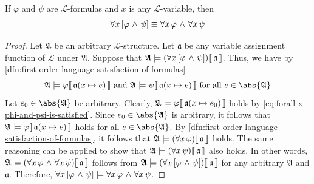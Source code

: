 \begin{thm}
     \label{logical-equivalence:universal-quantifiers-distributes-over-conjunction}
    If \( \varphi \) and \( \psi \) are \( \mathcal{L} \)-formulas and \( x \) is any \( \mathcal{L} \)-variable,
    then
    \begin{equation*}
        \forall x \, \mleft[ \varphi \,\,{\land}\,\, \psi \mright] \equiv \forall x \, \varphi \,\,{\land}\,\, \forall x \, \psi
    \end{equation*}
\end{thm}

\begin{proof}
    Let \( \mathfrak{A} \) be an arbitrary \( \mathcal{L} \)-structure. Let \( \mathfrak{a} \) be any variable assignment function of \( \mathcal{L} \) under \( \mathfrak{A} \).
    Suppose that \( \folwffsatisfaction{\mathfrak{A}}{\mleft( \forall x \, \mleft[ \varphi \,\,{\land}\,\, \psi \mright] \mright)}{\mathfrak{a}} \).
    Thus, we have by \cref{dfn:first-order-language-satisfaction-of-formulas}
    \begin{equation}
        \label{eq:forall-x-phi-and-psi-is-satisfied}
        \folwffsatisfaction{\mathfrak{A}}{\varphi}{ \folmodifiedvariableassignmentfunction{\mathfrak{a}}{x}{e} } \ \text{and}
        \ \folwffsatisfaction{\mathfrak{A}}{\psi}{ \folmodifiedvariableassignmentfunction{\mathfrak{a}}{x}{e} } \ \text{for all} \ e \in \abs{\mathfrak{A}}
    \end{equation}
    Let \( e_{0} \in \abs{\mathfrak{A}} \) be arbitrary.
    Clearly, \( \folwffsatisfaction{\mathfrak{A}}{\varphi}{ \folmodifiedvariableassignmentfunction{\mathfrak{a}}{x}{e_{0}} } \) holds by
    \eqref{eq:forall-x-phi-and-psi-is-satisfied}.
    Since \( e_{0} \in \abs{\mathfrak{A}} \) is arbitrary,
    it follows that \( \folwffsatisfaction{\mathfrak{A}}{\varphi}{ \folmodifiedvariableassignmentfunction{\mathfrak{a}}{x}{e} } \) holds for
    all \( e \in \abs{\mathfrak{A}} \).
    By \cref{dfn:first-order-language-satisfaction-of-formulas}, it follows that \( \folwffsatisfaction{\mathfrak{A}}{\mleft( \forall x \, \varphi \mright)}{\mathfrak{a}} \) holds.
    The same reasoning can be applied to show that \( \folwffsatisfaction{\mathfrak{A}}{\mleft( \forall x \, \psi \mright)}{\mathfrak{a}} \) also holds.
    In other words, \( \folwffsatisfaction{\mathfrak{A}}{\mleft( \forall x \, \varphi \,\,{\land}\,\, \forall x \, \psi \mright)}{\mathfrak{a}} \) follows from
    \( \folwffsatisfaction{\mathfrak{A}}{\mleft( \forall x \, \mleft[ \varphi \,\,{\land}\,\, \psi \mright] \mright)}{\mathfrak{a}} \)
    for any arbitrary \( \mathfrak{A} \) and \( \mathfrak{a} \).
    Therefore, \( \forall x \, \mleft[ \varphi \,\,{\land}\,\, \psi \mright] \models \forall x \, \varphi \,\,{\land}\,\, \forall x \, \psi \).


\end{proof}
